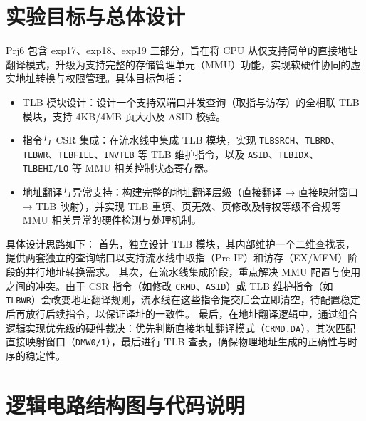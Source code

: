 \documentclass[11pt]{article}
\begin{document}
\newcommand{\name}{袁晨圃, 王永生, 李知谦}
\newcommand{\studentNum}{19}
\newcommand{\major}{计算机科学与技术}
\newcommand{\labNum}{17,18,19}
\newcommand{\labName}{存储管理单元设计}



\section{实验目标与总体设计}

Prj6 包含 exp17、exp18、exp19 三部分，旨在将 CPU 从仅支持简单的直接地址翻译模式，升级为支持完整的存储管理单元（MMU）功能，实现软硬件协同的虚实地址转换与权限管理。具体目标包括：

\begin{itemize}
    \item TLB 模块设计：设计一个支持双端口并发查询（取指与访存）的全相联 TLB 模块，支持 4KB/4MB 页大小及 ASID 校验。 
    \item 指令与 CSR 集成：在流水线中集成 TLB 模块，实现 \verb|TLBSRCH|、\verb|TLBRD|、\verb|TLBWR|、\verb|TLBFILL|、\verb|INVTLB| 等 TLB 维护指令，以及 \verb|ASID|、\verb|TLBIDX|、\verb|TLBEHI/LO| 等 MMU 相关控制状态寄存器。 
    \item 地址翻译与异常支持：构建完整的地址翻译层级（直接翻译 → 直接映射窗口 → TLB 映射），并实现 TLB 重填、页无效、页修改及特权等级不合规等 MMU 相关异常的硬件检测与处理机制。
\end{itemize}

具体设计思路如下：
首先，独立设计 TLB 模块，其内部维护一个二维查找表，提供两套独立的查询端口以支持流水线中取指（Pre-IF）和访存（EX/MEM）阶段的并行地址转换需求。
其次，在流水线集成阶段，重点解决 MMU 配置与使用之间的冲突。由于 CSR 指令（如修改 \verb|CRMD|、\verb|ASID|）或 TLB 维护指令（如 \verb|TLBWR|）会改变地址翻译规则，流水线在这些指令提交后会立即清空，待配置稳定后再放行后续指令，以保证译址的一致性。
最后，在地址翻译逻辑中，通过组合逻辑实现优先级的硬件裁决：优先判断直接地址翻译模式（\verb|CRMD.DA|），其次匹配直接映射窗口（\verb|DMW0/1|），最后进行 TLB 查表，确保物理地址生成的正确性与时序的稳定性。

\section{逻辑电路结构图与代码说明}




\end{document}
